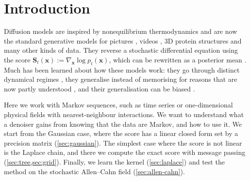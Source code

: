 \section{Introduction}
\label{sec:intro}

Diffusion models are inspired by nonequilibrium thermodynamics \cite{sohl2015deep} and are now the standard generative
models for pictures \cite{rombach2022latent,betker2023dalle3}, videos \cite{veo3}, 3D protein structures
\cite{abramson2024alphafold3} and many other kinds of data. They reverse a stochastic differential equation
\cite{anderson1982reverse,ho2020denoising,song2021scorebased} using the score
$\mathbf S_t(\mathbf x)
    := \nabla_{\mathbf x}\log p_t(\mathbf x)$, which can be rewritten as a posterior mean
\cite{robbins1956empirical,vincent2011connection,efron2011tweedie}. Much has been learned about how these models work:
they go through distinct dynamical regimes \cite{biroli2023generative,biroli2024dynamical,achilli2026speciation}, they
generalise instead of memorising for reasons that are now partly understood
\cite{kadkhodaie2024generalization,achilli2025memorization,bonnaire2025memorize}, and their generalisation can be biased
\cite{garnierbrun2026biased}.

Here we work with Markov sequences, such as time series or one-dimensional physical fields with nearest-neighbour
interactions. We want to understand what a denoiser gains from knowing that the data are Markov, and how to use it. We
start from the Gaussian case, where the score has a linear closed form set by a precision matrix (\cref{sec:gaussian}).
The simplest case where the score is not linear is the Laplace chain, and there we compute the exact score with message
passing \cite{pearl1988probabilistic,mezard2002analytic,mezard2003passing,mezard2009information}
(\cref{sec:tree,sec:grid}). Finally, we learn the kernel (\cref{sec:laplace}) and test the method on the stochastic
Allen--Cahn field \cite{allen1979microscopic} (\cref{sec:allen-cahn}).

